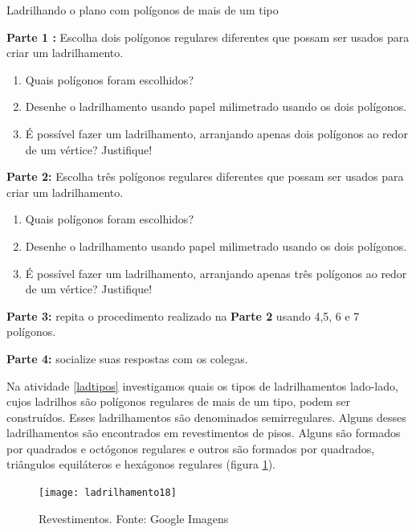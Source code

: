 




\begin{task}{Ladrilhando o plano com polígonos de mais de um tipo}\label{ladtipos}

\textbf{Parte 1 :} Escolha dois polígonos regulares diferentes que possam ser usados para criar um ladrilhamento. 
\begin{enumerate}
\item Quais polígonos foram escolhidos?
\item Desenhe o ladrilhamento usando papel milimetrado usando os dois polígonos. 
\item É possível fazer um ladrilhamento, arranjando  apenas dois polígonos ao redor de um vértice? Justifique! 
\end{enumerate}

\textbf{Parte 2:} Escolha três polígonos regulares diferentes que possam ser usados para criar um ladrilhamento. 
\begin{enumerate}
\item Quais polígonos foram escolhidos?
\item Desenhe o ladrilhamento usando papel milimetrado usando os dois polígonos. 
\item É possível fazer um ladrilhamento, arranjando  apenas três polígonos ao redor de um vértice? Justifique! 
\end{enumerate}


\textbf{Parte 3:} repita o procedimento realizado na \textbf{Parte 2 }usando 4,5, 6 e 7 polígonos.

\textbf{Parte 4:} socialize suas respostas com os colegas.

\end{task}



Na atividade \ref{ladtipos} investigamos  quais os tipos de ladrilhamentos lado-lado, cujos ladrilhos são polígonos regulares de mais de um tipo, podem ser construídos. Esses ladrilhamentos são denominados semirregulares. Alguns desses ladrilhamentos são encontrados em revestimentos de pisos. Alguns são formados por quadrados e octógonos regulares  e outros são formados por quadrados, triângulos equiláteros e hexágonos regulares (figura \ref{lad_tp1}).


\begin{figure}[H]
\centering
\texttt{[image: ladrilhamento18]}
\label{lad_tp1}
\caption{Revestimentos. Fonte: Google Imagens}
\end{figure}


